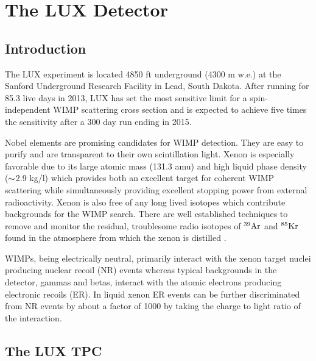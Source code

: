 

\renewcommand{\thechapter}{2}

\chapter{The LUX Detector}

\section{Introduction}

The LUX experiment is located 4850 ft underground (4300 m w.e.) at the Sanford Underground Research Facility in Lead, South Dakota. After running for 85.3 live days in 2013, LUX has set the most sensitive limit for a spin-independent WIMP scattering cross section \cite{LUX_PRL} and is expected to achieve five times the sensitivity after a 300 day run ending in 2015. 

Nobel elements are promising candidates for WIMP detection. They are easy to purify and are transparent to their own scintillation light. Xenon is especially favorable due to its  large atomic mass (131.3 amu) and high liquid phase density ($\rm \sim$2.9 kg/l) which provides both an excellent target for coherent WIMP scattering while simultaneously providing excellent stopping power from external radioactivity. Xenon is also free of any long lived isotopes which contribute backgrounds for the WIMP search. There are well established techniques to remove and monitor the residual, troublesome radio isotopes of $\rm ^{39}Ar$ and $\rm^{85}Kr$ found in the atmosphere from which the xenon is distilled \cite{Aprile_LXe_overview} \cite{Kr_ppt_Dobi} \cite{lux_kr_removal} \cite{xmass_kr_removal}.
 
WIMPs, being electrically neutral, primarily interact with the xenon target nuclei producing nuclear recoil (NR) events whereas typical backgrounds in the detector, gammas and betas, interact with the atomic electrons producing electronic recoils (ER). In liquid xenon ER events can be further discriminated from NR events by about a factor of 1000 by taking the charge to light ratio of the interaction.



\section{The LUX TPC}

